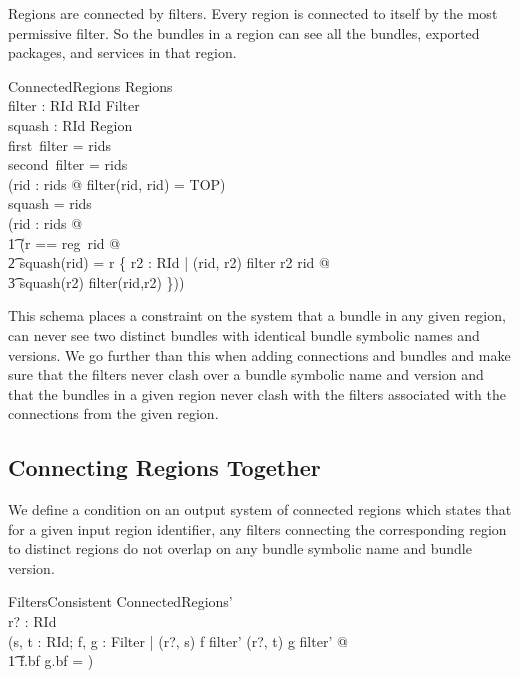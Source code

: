\documentclass[a4paper,9pt]{article}
\begin{document}
Regions are connected by filters.
Every region is connected to itself by the most permissive filter.
So the bundles in a region can see all the bundles, exported packages, and services in that region.
\begin{schema}{ConnectedRegions}
  Regions \\
  filter : RId \cross RId \pfun Filter \\
  squash : RId \pfun Region \\
\where
  first~\limg \dom filter \rimg = rids \\
  second~\limg \dom filter \rimg = rids \\
  (\forall rid : rids @ filter(rid, rid) = TOP) \\
  \dom squash = rids \\
  (\forall rid : rids @ \\
\t1 (\LET r == reg~rid @ \\
\t2 squash(rid) = r \sqcup \bigsqcup \{ r2 : RId | (rid, r2) \in \dom filter \land r2 \neq rid @ \\
\t3 squash(r2) \wr filter(rid,r2) \}))\\
\end{schema}

This schema places a constraint on the system that a bundle in any given region, can never see two
distinct bundles with identical bundle symbolic names and versions.
We go further than this when adding connections and bundles and make sure that the filters
never clash over a bundle symbolic name and version and that the bundles in a given region never clash
with the filters associated with the connections from the given region.

\subsection{Connecting Regions Together}

We define a condition on an output system of connected regions which states that
for a given input region identifier, any filters connecting the corresponding region to distinct
regions do not overlap on any bundle symbolic name and bundle version.
\begin{schema}{FiltersConsistent}
   ConnectedRegions' \\
   r? : RId \\
\where
  (\forall s, t : RId; f, g : Filter | (r?, s) \mapsto f \in filter' \land (r?, t) \mapsto g \in filter' @ \\
\t1 f.bf \cap g.bf = \emptyset )
\end{schema}
\end{document}
